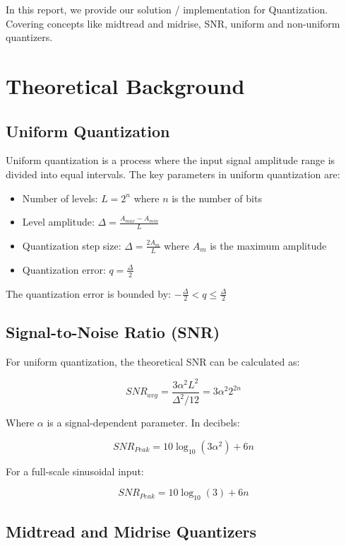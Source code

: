 \documentclass{article}
\begin{document}
In this report, we provide our solution / implementation for Quantization. Covering concepts like midtread and midrise, SNR, uniform and non-uniform quantizers.

\section{Theoretical Background}

\subsection{Uniform Quantization}

Uniform quantization is a process where the input signal amplitude range is divided into equal intervals. The key parameters in uniform quantization are:

\begin{itemize}
    \item Number of levels: $L = 2^n$ where $n$ is the number of bits
    \item Level amplitude: $\Delta = \frac{A_{max} - A_{min}}{L}$
    \item Quantization step size: $\Delta = \frac{2A_m}{L}$ where $A_m$ is the maximum amplitude
    \item Quantization error: $q = \frac{\Delta}{2}$
\end{itemize}

The quantization error is bounded by: $-\frac{\Delta}{2} < q \leq \frac{\Delta}{2}$

\subsection{Signal-to-Noise Ratio (SNR)}

For uniform quantization, the theoretical SNR can be calculated as:

$$SNR_{avg} = \frac{3\alpha^2 L^2}{\Delta^2/12} = 3\alpha^2 2^{2n}$$

Where $\alpha$ is a signal-dependent parameter. In decibels:

$$SNR_{Peak} = 10\log_{10}(3\alpha^2) + 6n$$

For a full-scale sinusoidal input:

$$SNR_{Peak} = 10\log_{10}(3) + 6n$$

\subsection{Midtread and Midrise Quantizers}
\end{document}
